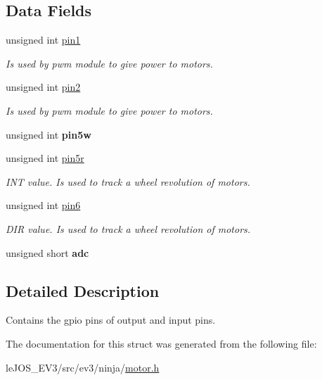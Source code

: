 \subsection*{Data Fields}
\begin{DoxyCompactItemize}
\item 
\hypertarget{structmotor__port__info_a3fc6cc33e12f94e78c5cbdc71d5416bc}{}unsigned int \hyperlink{structmotor__port__info_a3fc6cc33e12f94e78c5cbdc71d5416bc}{pin1}\label{structmotor__port__info_a3fc6cc33e12f94e78c5cbdc71d5416bc}

\begin{DoxyCompactList}\small\item\em Is used by pwm module to give power to motors. \end{DoxyCompactList}\item 
\hypertarget{structmotor__port__info_a9ff95d672cc5c5cd128fefae948d73fd}{}unsigned int \hyperlink{structmotor__port__info_a9ff95d672cc5c5cd128fefae948d73fd}{pin2}\label{structmotor__port__info_a9ff95d672cc5c5cd128fefae948d73fd}

\begin{DoxyCompactList}\small\item\em Is used by pwm module to give power to motors. \end{DoxyCompactList}\item 
\hypertarget{structmotor__port__info_ab9b1d229dc0f810218cc53a42fc37e2e}{}unsigned int {\bfseries pin5w}\label{structmotor__port__info_ab9b1d229dc0f810218cc53a42fc37e2e}

\item 
\hypertarget{structmotor__port__info_aab1edab0490b478d1b702d9880d24bad}{}unsigned int \hyperlink{structmotor__port__info_aab1edab0490b478d1b702d9880d24bad}{pin5r}\label{structmotor__port__info_aab1edab0490b478d1b702d9880d24bad}

\begin{DoxyCompactList}\small\item\em I\+N\+T value. Is used to track a wheel revolution of motors. \end{DoxyCompactList}\item 
\hypertarget{structmotor__port__info_a13e010069077bbf68832945b15ea0a4b}{}unsigned int \hyperlink{structmotor__port__info_a13e010069077bbf68832945b15ea0a4b}{pin6}\label{structmotor__port__info_a13e010069077bbf68832945b15ea0a4b}

\begin{DoxyCompactList}\small\item\em D\+I\+R value. Is used to track a wheel revolution of motors. \end{DoxyCompactList}\item 
\hypertarget{structmotor__port__info_ae547c2fbfdac55605f77262d52f213d0}{}unsigned short {\bfseries adc}\label{structmotor__port__info_ae547c2fbfdac55605f77262d52f213d0}

\end{DoxyCompactItemize}


\subsection{Detailed Description}
Contains the gpio pins of output and input pins. 

The documentation for this struct was generated from the following file\+:\begin{DoxyCompactItemize}
\item 
le\+J\+O\+S\+\_\+\+E\+V3/src/ev3/ninja/\hyperlink{motor_8h}{motor.\+h}\end{DoxyCompactItemize}
